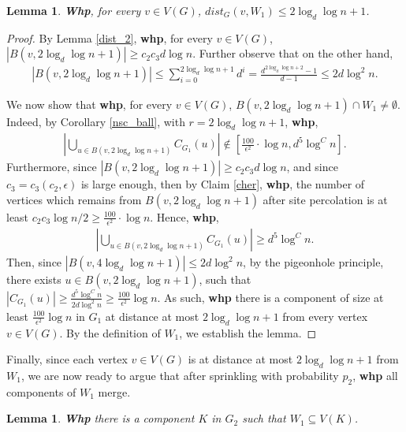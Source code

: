 \documentclass[notitlepage]{scrartcl}
\newtheorem{lemma}[thm]{Lemma}
\begin{document}
\begin{lemma} \label{W_2}
    \textbf{Whp}, for every $v\in V(G)$, $dist_G(v,W_1)\leq 2\log_d\log n+1$.
\end{lemma}
\begin{proof}
    By Lemma \ref{dist_2}, \textbf{whp}, for every $v\in V(G)$, $|B(v,2\log_d\log n+1)|\geq c_2c_3d\log n$. Further observe that on the other hand,
    \begin{align*}
        |B(v,2\log_d\log n+1)|\le \sum_{i=0}^{2\log_d\log n+1} d^i=\frac{d^{2\log_d\log n+2}-1}{d-1}\le 2d\log^2 n.
    \end{align*}
    
    We now show that \textbf{whp}, for every $v\in V(G)$, $B(v,2\log_d\log n+1)\cap W_1\neq \emptyset$. Indeed, by Corollary \ref{nsc_ball}, with $r=2\log_d\log n+1$, \textbf{whp},
    \begin{align*}
        \left|\bigcup_{u\in B(v,2\log_d\log n+1)}C_{G_1}(u)\right|\notin \left[\frac{100}{\epsilon^2}\cdot\log n,d^5\log^C n\right].
    \end{align*}
    Furthermore, since $|B(v,2\log_d\log n+1)|\geq c_2c_3d\log n$, and since $c_3=c_3(c_2,\epsilon)$ is large enough, then by Claim \ref{cher}, \textbf{whp}, the number of vertices which remains from $B(v,2\log_d\log n+1)$ after site percolation is at least $c_2c_3\log n/2\ge \frac{100}{\epsilon^2}\cdot\log n$. Hence, \textbf{whp}, 
    \begin{align*}
        \left|\bigcup_{u\in B(v,2\log_d\log n+1)}C_{G_1}(u)\right|\ge d^5\log^C n.
    \end{align*}
    Then, since $|B(v,4\log_d\log n+1)|\le 2d\log^2 n$, by the pigeonhole principle, there exists $u\in B(v,2\log_d\log n+1)$, such that $\left|C_{G_1}(u)\right|\ge \frac{d^5\log^C n}{2d\log^2 n}\ge \frac{100}{\epsilon^2}\log n$. As such, \textbf{whp} there is a component of size at least $\frac{100}{\epsilon^2}\log n$ in $G_1$ at distance at most $2\log_d \log n+1$ from every vertex $v\in V(G)$. By the definition of $W_1$, we establish the lemma.
\end{proof}

Finally, since each vertex $v\in V(G)$ is at distance at most $2\log_d\log n+1$ from $W_1$, we are now ready to argue that after sprinkling with probability $p_2$, \textbf{whp} all components of $W_1$ merge.

\begin{lemma} \label{one_comp_2}
    \textbf{Whp} there is a component $K$ in $G_2$ such that $W_1\subseteq V(K)$.
\end{lemma}
\end{document}
